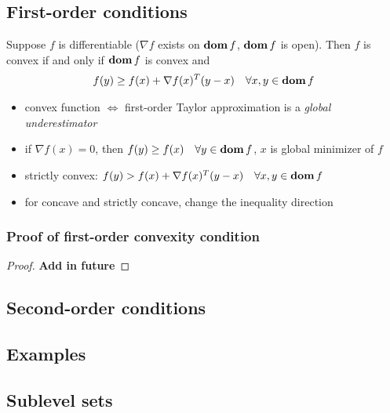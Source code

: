 \subsection{First-order conditions}
\label{subsec:3.1.3}
Suppose $f$ is differentiable (\ie $\nabla f$ exists on $\mathop{\bf dom} f$, $\mathop{\bf dom} f$ is open). Then $f$ is convex if and only if $\mathop{\bf dom} f$ is convex and
\begin{align}
  f(y)\ge f(x)+\nabla f(x)^T(y-x)\quad\forall x,y\in\mathop{\bf dom} f\label{eq:3.2}
\end{align}
\begin{itemize}
  \item convex function $\Leftrightarrow$ first-order Taylor approximation is a \textit{global underestimator}
  \item if $\nabla f(x)=0$, then $f(y)\ge f(x)\quad\forall y\in \mathop{\bf dom} f$, \ie $x$ is global minimizer of $f$
  \item strictly convex: $f(y)>f(x)+\nabla f(x)^T(y-x)\quad\forall x,y\in\mathop{\bf dom} f$
  \item for concave and strictly concave, change the inequality direction
\end{itemize}
\subsubsection{Proof of first-order convexity condition}
\begin{proof}
  \textbf{Add in future}
\end{proof}

\subsection{Second-order conditions}
\begin{example}
\end{example}
\begin{remark}
\end{remark}

\subsection{Examples}

\subsection{Sublevel sets}
\begin{example}
\end{example}

